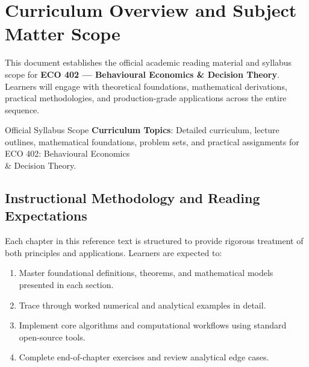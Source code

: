 \section{Curriculum Overview and Subject Matter Scope}

This document establishes the official academic reading material and syllabus scope for \textbf{ECO 402 --- Behavioural Economics \& Decision Theory}. Learners will engage with theoretical foundations, mathematical derivations, practical methodologies, and production-grade applications across the entire sequence.

\begin{InsightBox}{Official Syllabus Scope}
  \textbf{Curriculum Topics}: Detailed curriculum, lecture outlines, mathematical foundations, problem sets, and practical assignments for ECO 402: Behavioural Economics \\& Decision Theory.
\end{InsightBox}

\subsection{Instructional Methodology and Reading Expectations}

Each chapter in this reference text is structured to provide rigorous treatment of both principles and applications. Learners are expected to:
\begin{enumerate}
  \item Master foundational definitions, theorems, and mathematical models presented in each section.
  \item Trace through worked numerical and analytical examples in detail.
  \item Implement core algorithms and computational workflows using standard open-source tools.
  \item Complete end-of-chapter exercises and review analytical edge cases.
\end{enumerate}

